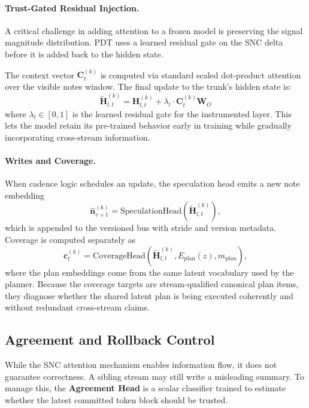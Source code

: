\paragraph{Trust-Gated Residual Injection.}
A critical challenge in adding attention to a frozen model is preserving the signal magnitude distribution. PDT uses a learned residual gate on the SNC delta before it is added back to the hidden state.

The context vector $\mathbf{C}^{(k)}_t$ is computed via standard scaled dot-product attention over the visible notes window. The final update to the trunk's hidden state is:
\begin{equation}
    \tilde{\mathbf{H}}^{(k)}_{l,t} = \mathbf{H}^{(k)}_{l,t} + \lambda_l \cdot \mathbf{C}^{(k)}_t \mathbf{W}_O
\end{equation}
where $\lambda_l \in [0, 1]$ is the learned residual gate for the instrumented layer. This lets the model retain its pre-trained behavior early in training while gradually incorporating cross-stream information.

\paragraph{Writes and Coverage.}
When cadence logic schedules an update, the speculation head emits a new note embedding
\begin{equation}
    \widehat{\mathbf{n}}^{(k)}_{v+1} = \mathrm{SpeculationHead}\!\left(\tilde{\mathbf{H}}^{(k)}_{l,t}\right),
\end{equation}
which is appended to the versioned bus with stride and version metadata. Coverage is computed separately as
\begin{equation}
    \mathbf{c}^{(k)}_t = \mathrm{CoverageHead}\!\left(\tilde{\mathbf{H}}^{(k)}_{l,t}, E_{\text{plan}}(z), m_{\text{plan}}\right),
\end{equation}
where the plan embeddings come from the same latent vocabulary used by the planner. Because the coverage targets are stream-qualified canonical plan items, they diagnose whether the shared latent plan is being executed coherently and without redundant cross-stream claims.

\subsection{Agreement and Rollback Control}
\label{sec:agreement}

While the SNC attention mechanism enables information flow, it does not guarantee correctness. A sibling stream may still write a misleading summary. To manage this, the \textbf{Agreement Head} is a scalar classifier trained to estimate whether the latest committed token block should be trusted.

